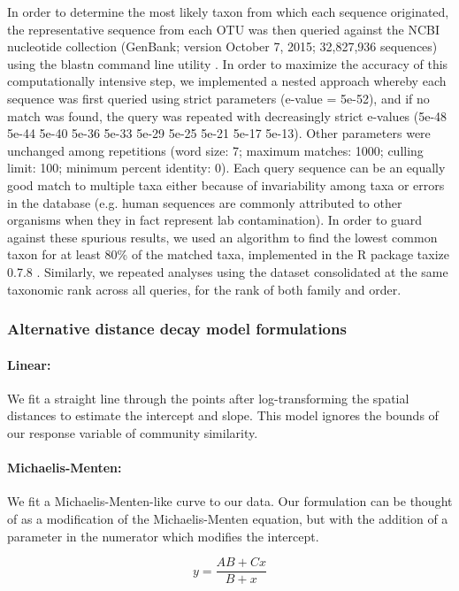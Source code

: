 \documentclass[11pt,letterpaper]{article} %
\begin{document}
In order to determine the most likely taxon from which each sequence originated, the representative sequence from each OTU was then queried against the NCBI nucleotide collection (GenBank; version October 7, 2015; 32,827,936 sequences) using the blastn command line utility \citep{Camacho2009}. In order to maximize the accuracy of this computationally intensive step, we implemented a nested approach whereby each sequence was first queried using strict parameters (e-value = 5e-52), and if no match was found, the query was repeated with decreasingly strict e-values (5e-48 5e-44 5e-40 5e-36 5e-33 5e-29 5e-25 5e-21 5e-17 5e-13). Other parameters were unchanged among repetitions (word size: 7; maximum matches: 1000; culling limit: 100; minimum percent identity: 0). Each query sequence can be an equally good match to multiple taxa either because of invariability among taxa or errors in the database (e.g. human sequences are commonly attributed to other organisms when they in fact represent lab contamination). In order to guard against these spurious results, we used an algorithm to find the lowest common taxon for at least 80\% of the matched taxa, implemented in the R package taxize 0.7.8 \citep{Chamberlain2013, Chamberlain2016}. Similarly, we repeated analyses using the dataset consolidated at the same taxonomic rank across all queries, for the rank of both family and order.


\subsubsection*{Alternative distance decay model formulations}

\paragraph{Linear:} We fit a straight line through the points after log-transforming the spatial distances to estimate the intercept and slope. This model ignores the bounds of our response variable of community similarity.


\paragraph{Michaelis-Menten:} We fit a Michaelis-Menten-like curve to our data.
Our formulation can be thought of as a modification of the Michaelis-Menten equation, but with the addition of a parameter in the numerator which modifies the intercept.

\begin{equation}\label{MM_full}
	y = \frac{AB + Cx}{B+x}
\end{equation}
\end{document}
